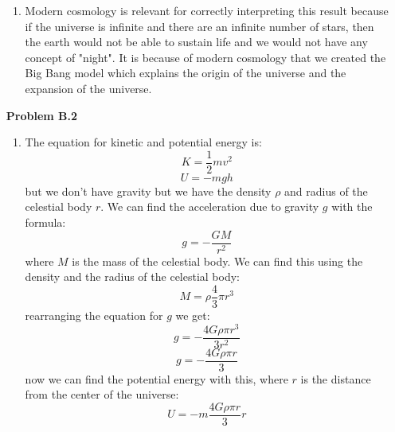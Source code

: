\documentclass{article}
\theoremstyle{plain}
\begin{document}
\begin{enumerate}
\begin{enumerate}[label=(\alph*)]
              \item Modern cosmology is relevant for correctly interpreting this result because if the universe is infinite and there are an infinite number of stars, then the earth would not be able to sustain life and we would not have any concept of "night". It is because of modern cosmology that we created the Big Bang model which explains the origin of the universe and the expansion of the universe.
          \end{enumerate}
    \item[\textbf{Problem B.2}]
          \begin{enumerate}[label=(\alph*)]
              \item The equation for kinetic and potential energy is:
                    \begin{equation*}
                        K = \frac{1}{2}mv^2
                    \end{equation*}
                    \begin{equation*}
                        U = -m g h
                    \end{equation*}
                    but we don't have gravity but we have the density $\rho$ and radius of the celestial body $r$. We can find the acceleration due to gravity $g$ with the formula:
                    \begin{equation*}
                        g = -\frac{G M}{r^2}
                    \end{equation*}
                    where $M$ is the mass of the celestial body. We can find this using the density and the radius of the celestial body:
                    \begin{equation*}
                        M = \rho \frac{4}{3}\pi r^3
                    \end{equation*}
                    rearranging the equation for $g$ we get:
                    \begin{equation*}
                        g = -\frac{4G \rho \pi r^3}{3r^2}
                    \end{equation*}
                    \begin{equation*}
                        g = -\frac{4G \rho \pi r}{3}
                    \end{equation*}
                    now we can find the potential energy with this, where $r$ is the distance from the center of the universe:
                    \begin{equation*}
                        U = -m \frac{4G \rho \pi r}{3} r

\end{equation*}
\end{enumerate}
\end{enumerate}
\end{document}
